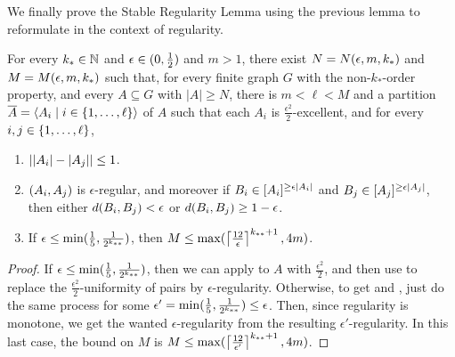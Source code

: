     We finally prove the Stable Regularity Lemma using the previous lemma to reformulate
     in the context of regularity.

    \begin{theorem}[Theorem 5.19] \label{thm:existance_of_regular_partitions}
        For every $k_* \in \mathbb{N}$ and $\epsilon \in ( 0, \frac{1}{2} )$ and $m > 1$, there exist $N = N( \epsilon, m, k_* )$
        and $M = M( \epsilon, m, k_* )$ such that, for every finite graph $G$ with the non-$k_{*}$-order property,
        and every $A \subseteq G$ with $|A| \geq N$, there is $m < \ell < M$ and a partition
        $\overline{A} = \left< A_i \mid i \in \{ 1, \dots, \ell \} \right>$ of $A$ such that each $A_i$ is
        $\frac{\epsilon^2}{2}$-excellent, and for every $i, j \in \{ 1, \dots, \ell \}$,
        \begin{enumerate}
            \item \label{itm:existance_of_regular_partitions.1} $| | A_i |- | A_j | | \leq 1$.
            \item \label{itm:existance_of_regular_partitions.2} $( A_i, A_j )$ is $\epsilon$-regular, and moreover if
                $B_i \in [ A_i ]^{\geq \epsilon | A_i |}$ and $B_j \in [ A_j ]^{\geq \epsilon | A_j |}$,
                then either $d( B_i, B_j ) < \epsilon$ or $d( B_i, B_j ) \geq 1 - \epsilon$.
            \item \label{itm:existance_of_regular_partitions.3} If $\epsilon \leq \min ( \frac{1}{5}, \frac{1}{2^{k_{**}}} )$, then
                $M \leq \max ( \left\lceil \frac{12}{\epsilon} \right\rceil^{k_{**}+1}, 4m )$.
        \end{enumerate}
        \begin{proof}
            If $\epsilon \leq \min ( \frac{1}{5}, \frac{1}{2^{k_{**}}} )$, then we can apply 
            to $A$ with $\frac{\epsilon^2}{2}$, and then use  to replace the
            $\frac{\epsilon^2}{2}$-uniformity of pairs by $\epsilon$-regularity.
            Otherwise, to get  and ,
            just do the same process for some $\epsilon' = \min ( \frac{1}{5}, \frac{1}{2^{k_{**}}} ) \leq \epsilon$.
            Then, since regularity is monotone, we get the wanted $\epsilon$-regularity from the resulting $\epsilon'$-regularity.
            In this last case, the bound on $M$ is $M \leq \max ( \left\lceil \frac{12}{\epsilon'} \right\rceil^{k_{**}+1}, 4m )$.
        \end{proof}
    \end{theorem}

